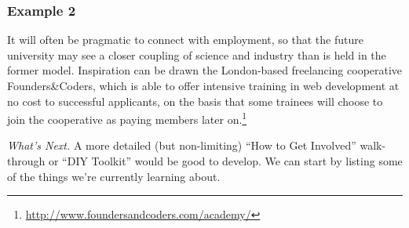 \subsubsection*{Example 2} It will often be pragmatic to connect
 with employment, so that the future
university may see a closer coupling of science and industry than is
held in the former model.  Inspiration can be drawn the London-based freelancing cooperative Founders\&Coders, which is
able to offer intensive training in web development at no cost to
successful applicants, on the basis that some trainees will choose to
join the cooperative as paying members later
on.\footnote{\url{http://www.foundersandcoders.com/academy/}}


\begin{framed}
\noindent 
\emph{What's Next.}
A more detailed (but non-limiting) ``How to Get Involved'' walk-through or ``DIY Toolkit'' would be good to develop. We can start by listing some of the things we're currently learning about.
\end{framed}

